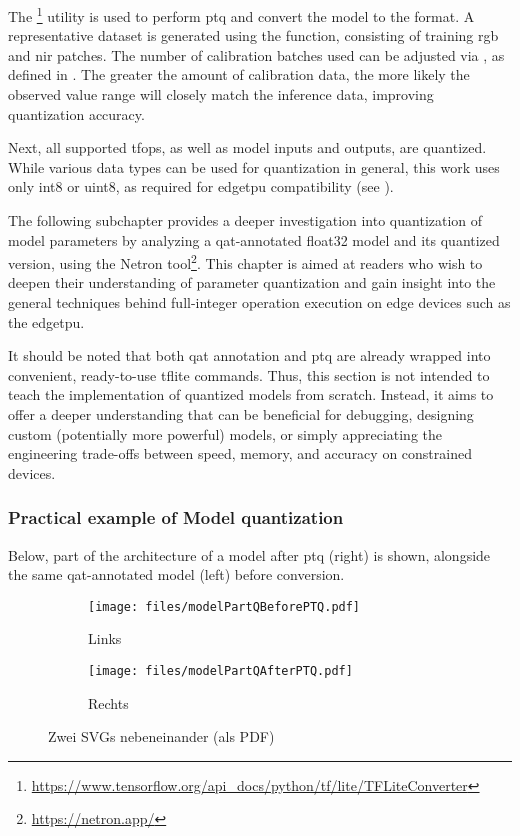 {The \footnote{\url{https://www.tensorflow.org/api_docs/python/tf/lite/TFLiteConverter}} utility is used to perform \gls{ptq} and convert the model to
the  format.
A representative dataset is generated using the  function, consisting of training \gls{rgb} and \gls{nir} patches.
The number of calibration batches used can be adjusted via , as defined in .
The greater the amount of calibration data, the more likely the observed value range will closely match the inference data, improving quantization accuracy.

Next, all supported \glspl{tfop}, as well as model inputs and outputs, are quantized.
While various data types can be used for quantization in general, this work uses only \gls{int8} or \gls{uint8}, as required for \gls{edgetpu} compatibility (see ).

The following subchapter provides a deeper investigation into quantization of model parameters by analyzing a \gls{qat}-annotated \gls{float32} model and its quantized version, using the Netron tool\footnote{\url{https://netron.app/}}.
This chapter is aimed at readers who wish to deepen their understanding of parameter quantization and gain insight into the general techniques behind full-integer operation execution on edge devices such as the \gls{edgetpu}.

It should be noted that both \gls{qat} annotation and \gls{ptq} are already wrapped into convenient, ready-to-use \gls{tflite} commands. Thus, this section is not intended to teach the implementation of quantized models from scratch. Instead, it aims to offer a deeper understanding that can be beneficial for debugging, designing custom (potentially more powerful) models, or simply appreciating the engineering trade-offs between speed, memory, and accuracy on constrained devices.

\subsubsection*{Practical example of Model quantization}
\label{subsubsec:optquant}

Below, part of the architecture of a  model after \gls{ptq} (right) is shown, alongside the same \gls{qat}-annotated model (left) before conversion.

\begin{figure}[H]
  \centering
  \begin{subfigure}[t]{0.48\textwidth}
    \centering
    \texttt{[image: files/modelPartQBeforePTQ.pdf]}
    \caption{Links}
  \end{subfigure}
  \hfill
  \begin{subfigure}[t]{0.48\textwidth}
    \centering
    \texttt{[image: files/modelPartQAfterPTQ.pdf]}
    \caption{Rechts}
  \end{subfigure}
  \caption{Zwei SVGs nebeneinander (als PDF)}
\end{figure}

}
